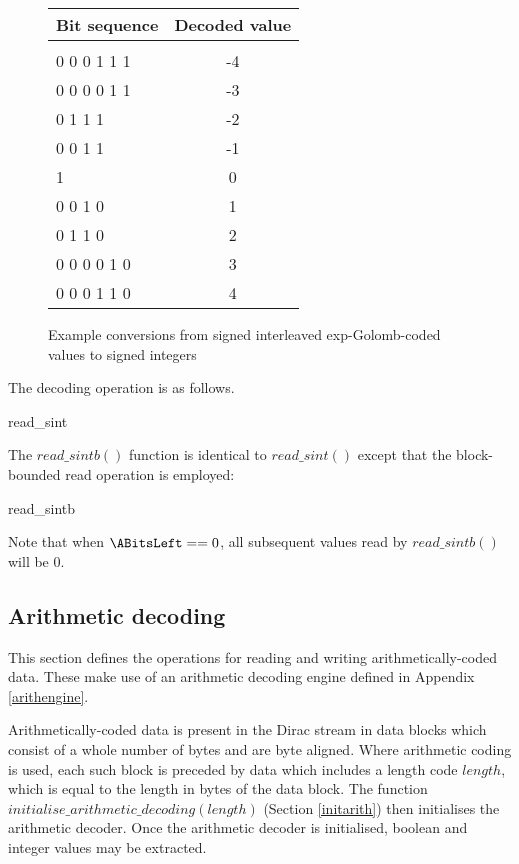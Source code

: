 \begin{figure}[h]
\centering
\begin{tabular}{l|c}
Bit sequence & Decoded value \\
\hline\\
0 0 0 1 1 1         &  -4\\
0 0 0 0 1 1         &  -3\\
0 1 1 1            &  -2\\
0 0 1 1           &  -1\\
1                 &  0\\
0 0 1 0           &  1\\
0 1 1 0            &  2\\
0 0 0 0 1 0         &  3\\
0 0 0 1 1 0         &  4\\
\end{tabular}

\caption{Example conversions from signed interleaved exp-Golomb-coded values 
to signed integers \label{segolcodings}}
\end{figure}

The decoding operation is as follows.

\begin{pseudo}{read\_sint}{}
\bsEND
{}
\end{pseudo}

The $read\_sintb()$ function is identical to $read\_sint()$ except that the block-bounded read
operation is employed:

\begin{pseudo}{read\_sintb}{}
\bsEND
{}
\end{pseudo}

Note that when $\ABitsLeft==0$, all subsequent values read by $read\_sintb()$ will be 0.

\subsection{Arithmetic decoding}

\label{arithdecoding}

This section defines the operations for reading and writing arithmetically-coded
data. These make use of an arithmetic decoding engine defined in Appendix 
\ref{arithengine}. 

Arithmetically-coded data is present in the Dirac stream in data blocks which consist of
a whole number of bytes and are byte aligned. Where arithmetic coding is used, each such
block is preceded by data which includes a length code $length$, which is equal to the length in
bytes of the data block. The function $initialise\_arithmetic\_decoding(length)$
(Section \ref{initarith}) then initialises the arithmetic decoder. Once the arithmetic
decoder is initialised, boolean and integer values may be extracted.

